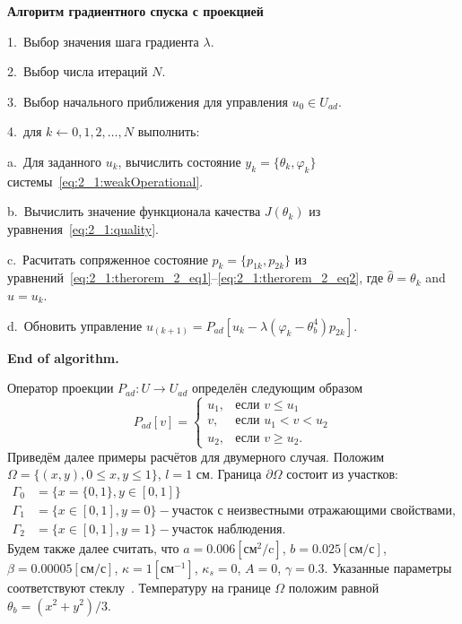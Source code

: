 \textbf{Алгоритм градиентного спуска с проекцией}

1.\ Выбор значения шага градиента $\lambda$.

2.\ Выбор числа итераций $N$.

3.\ Выбор начального приближения для управления $u_0 \in U_{ad}$.

4.\ для $k \leftarrow 0,1,2, \ldots, N$ выполнить:

\hspace{1cm} a.\ Для заданного $u_{k}$, вычислить состояние $y_k = \{\theta_k, \varphi_k\}$
системы~\eqref{eq:2_1:weakOperational}.

\hspace{1cm} b.\ Вычислить значение функционала качества
$J(\theta_k)$ из уравнения~\eqref{eq:2_1:quality}.

\hspace{1cm} c.\ Расчитать сопряженное состояние $p_k = \{p_{1k}, p_{2k}\}$
из уравнений~\eqref{eq:2_1:therorem_2_eq1}--\eqref{eq:2_1:therorem_2_eq2},
где $\hat{\theta} = \theta_k$ and $\hat{u} = u_k$.

\hspace{1cm} d.\ Обновить управление $u_{(k+1)} = P_{ad} [ u_k -
\lambda(\varphi_k - \theta_b^4) p_{2k} ]$.

\textbf{End of algorithm.}

Оператор проекции $P_{ad} : U \to U_{ad}$ определён следующим образом
\[
    P_{ad}[v] =
    \begin{cases}
        u_1, & \text{если } v \le u_1 \\
        v, & \text{если } u_1 < v < u_2 \\
        u_2, & \text{если } v \ge u_2.
    \end{cases}
\]
Приведём далее примеры расчётов для двумерного случая.
Положим $\Omega = \{(x,y), 0 \leq x,y \leq 1\}$, $l = 1$ см.
Граница $\partial\Omega$ состоит из участков:
\[
    \begin{aligned}
        \Gamma_0 & = \{x=\{0,1\}, y \in [0,1]\} \\
        \Gamma_1 & = \{x\in [0,1], y=0\}
        - \text{участок с неизвестными отражающими свойствами}, \\
        \Gamma_2 & = \{x \in [0,1], y=1\} - \text{участок наблюдения}.
    \end{aligned}
\]
Будем также далее считать, что $a = 0.006[\text{см}^2/\text{c}]$,
$b=0.025[\text{см}/\text{с}]$, $\beta = 0.00005[\text{см}/\text{с}]$,
$\kappa=1[\text{см}^{-1}]$, $\kappa_s = 0$, $A = 0$, $\gamma = 0.3$.
Указанные параметры соответствуют стеклу~\cite{Grenkin2016a}.
Температуру на границе $\Omega$ положим равной $\theta_b = (x^2+y^2)/3$.

